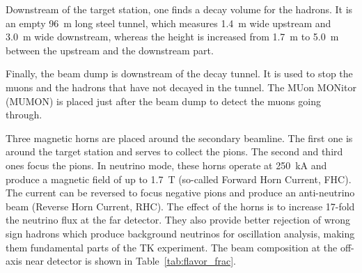Downstream of the target station, one finds a decay volume for the
hadrons. It is an empty 96~m long steel tunnel, which measures 1.4~m
wide upstream and 3.0~m wide downstream, whereas the height is
increased from 1.7~m to 5.0~m between the upstream and the downstream
part.

Finally, the beam dump is downstream of the decay tunnel. It is used
to stop the muons and the hadrons that have not decayed in the
tunnel. The MUon MONitor (MUMON) is placed just after the beam dump to
detect the muons going through.

Three magnetic horns are placed around the secondary beamline. The
first one is around the target station and serves to collect the
pions. The second and third ones focus the pions. In neutrino mode,
these horns operate at 250~kA and produce a magnetic field of up to
1.7~T (so-called Forward Horn Current, \Gls{FHC}). The current can be
reversed to focus negative pions and produce an anti-neutrino beam
(Reverse Horn Current, \Gls{RHC}). The effect of the horns is to
increase 17-fold the neutrino flux at the far detector. They also
provide better rejection of wrong sign hadrons which produce
background neutrinos for oscillation analysis, making them fundamental
parts of the \Gls{TK} experiment. The beam composition at the off-axis
near detector is shown in Table~\ref{tab:flavor_frac}.

